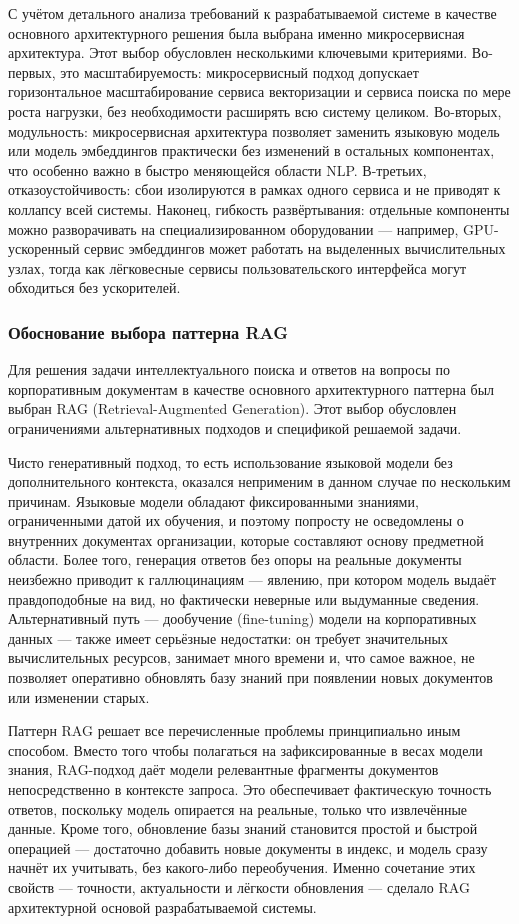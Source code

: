С учётом детального анализа требований к разрабатываемой системе в качестве основного архитектурного решения была выбрана именно микросервисная архитектура. Этот выбор обусловлен несколькими ключевыми критериями. Во-первых, это масштабируемость: микросервисный подход допускает горизонтальное масштабирование сервиса векторизации и сервиса поиска по мере роста нагрузки, без необходимости расширять всю систему целиком. Во-вторых, модульность: микросервисная архитектура позволяет заменить языковую модель или модель эмбеддингов практически без изменений в остальных компонентах, что особенно важно в быстро меняющейся области NLP. В-третьих, отказоустойчивость: сбои изолируются в рамках одного сервиса и не приводят к коллапсу всей системы. Наконец, гибкость развёртывания: отдельные компоненты можно разворачивать на специализированном оборудовании — например, GPU-ускоренный сервис эмбеддингов может работать на выделенных вычислительных узлах, тогда как лёгковесные сервисы пользовательского интерфейса могут обходиться без ускорителей.

\subsubsection{Обоснование выбора паттерна RAG}

Для решения задачи интеллектуального поиска и ответов на вопросы по корпоративным документам в качестве основного архитектурного паттерна был выбран RAG (Retrieval-Augmented Generation). Этот выбор обусловлен ограничениями альтернативных подходов и спецификой решаемой задачи.

Чисто генеративный подход, то есть использование языковой модели без дополнительного контекста, оказался неприменим в данном случае по нескольким причинам. Языковые модели обладают фиксированными знаниями, ограниченными датой их обучения, и поэтому попросту не осведомлены о внутренних документах организации, которые составляют основу предметной области. Более того, генерация ответов без опоры на реальные документы неизбежно приводит к галлюцинациям — явлению, при котором модель выдаёт правдоподобные на вид, но фактически неверные или выдуманные сведения. Альтернативный путь — дообучение (fine-tuning) модели на корпоративных данных — также имеет серьёзные недостатки: он требует значительных вычислительных ресурсов, занимает много времени и, что самое важное, не позволяет оперативно обновлять базу знаний при появлении новых документов или изменении старых.

Паттерн RAG решает все перечисленные проблемы принципиально иным способом. Вместо того чтобы полагаться на зафиксированные в весах модели знания, RAG-подход даёт модели релевантные фрагменты документов непосредственно в контексте запроса. Это обеспечивает фактическую точность ответов, поскольку модель опирается на реальные, только что извлечённые данные. Кроме того, обновление базы знаний становится простой и быстрой операцией — достаточно добавить новые документы в индекс, и модель сразу начнёт их учитывать, без какого-либо переобучения. Именно сочетание этих свойств — точности, актуальности и лёгкости обновления — сделало RAG архитектурной основой разрабатываемой системы.


